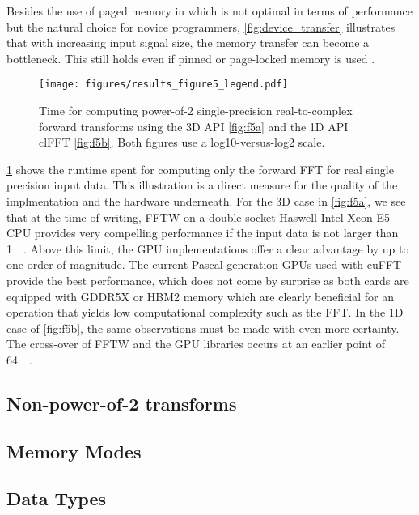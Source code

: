 Besides the use of paged memory in \gearshifft{} which is not optimal in terms of performance but the natural choice for novice programmers, \cref{fig:device_transfer} illustrates that with increasing input signal size, the memory transfer can become a bottleneck. This still holds even if pinned or page-locked memory is used \cite{steinbach_gtc2015}.

\begin{figure}[!tbp]
  \centering
  \texttt{[image: figures/results\_figure5\_legend.pdf]}
  \hfill
  \caption{Time for computing power-of-2 single-precision real-to-complex forward transforms using the 3D API \cref{fig:f5a} and the 1D API clFFT \cref{fig:f5b}. Both figures use a log10-versus-log2 scale.}
  \label{fig:r2c_fwd}
\end{figure}

\cref{fig:r2c_fwd} shows the runtime spent for computing only the forward FFT for real single precision input data. This illustration is a direct measure for the quality of the implmentation and the hardware underneath. For the 3D case in \cref{fig:f5a}, we see that at the time of writing, FFTW on a double socket Haswell Intel Xeon E5 CPU provides very compelling performance if the input data is not larger than \SI{1}{\mebi\byte}. Above this limit, the GPU implementations offer a clear advantage by up to one order of magnitude. The current Pascal generation GPUs used with cuFFT provide the best performance, which does not come by surprise as both cards are equipped with GDDR5X or HBM2 memory which are clearly beneficial for an operation that yields low computational complexity such as the FFT. In the 1D case of \cref{fig:f5b}, the same observations must be made with even more certainty. The cross-over of FFTW and the GPU libraries occurs at an earlier point of \SI{64}{\kibi\byte}.  

\subsection{Non-power-of-2 transforms}
\label{ssec:nonpowerof2}

\subsection{Memory Modes}
\label{ssec:mem_mode}

\subsection{Data Types}
\label{ssec:data_types}

